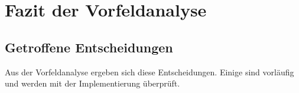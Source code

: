 \section{Fazit der Vorfeldanalyse}
\label{sec:fazit-vorfeld}
 
 
\subsection{Getroffene Entscheidungen}
\label{subsec:entscheidungen}
Aus der Vorfeldanalyse ergeben sich diese Entscheidungen. Einige sind vorläufig und werden mit der Implementierung überprüft.
 
